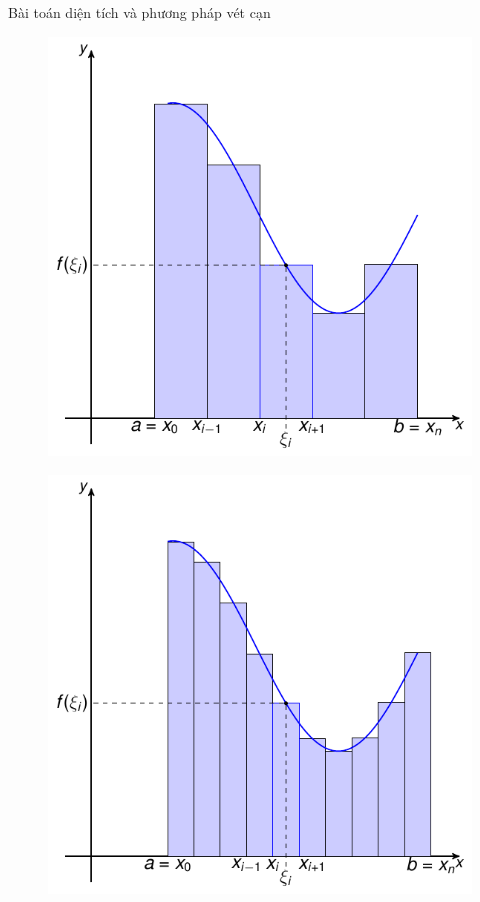 \begin{frame}{Bài toán diện tích và phương pháp vét cạn}
\begin{center}
    \begin{minipage}{0.45 \linewidth}
        \begin{figure}
            \centering
            \includegraphics[width=1\linewidth]{Figures/Int_2.pdf}
            \label{fig:Int_2}
        \end{figure}
    \end{minipage}
    \begin{minipage}{0.45\linewidth}
        \begin{figure}
            \centering
            \includegraphics[width=1\linewidth]{Figures/Int_3.pdf}

\end{figure}
\end{minipage}
\end{center}
\end{frame}
